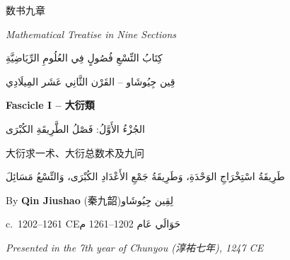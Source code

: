 \documentclass[11pt,a4paper]{article}
\newcommand{\ar}[1]{\arabicfont\beginR #1\endR}
\newcommand{\zhtext}[1]{{\chinese #1}}
\begin{document}
\begin{titlepage}
\begin{center}
\vspace*{1.5cm}

{\fontsize{28}{34}\selectfont\chineselg
\textcolor{titlecolor}{数书九章}}

\vspace{0.5cm}

{\fontsize{16}{20}\selectfont
\textcolor{sectioncolor}{\textit{Mathematical Treatise in Nine Sections}}}

\vspace{0.5cm}

{\large\ar{كِتَابُ التِّسْعِ فُصُولٍ فِي العُلُومِ الرِّيَاضِيَّةِ}}

\vspace{0.3cm}

{\footnotesize\ar{قِين جِيُوشَاو -- القَرْن الثَّانِي عَشَر المِيلَادِي}}

\vspace{1.2cm}

{\Large\bfseries Fascicle I -- \zhtext{大衍類}}

\vspace{0.3cm}

{\large\ar{الجُزْءُ الأَوَّلُ: فَصْلُ الطَّرِيقَةِ الكُبْرَى}}

\vspace{0.5cm}

{\normalsize\zhtext{大衍求一术、大衍总数术及九问}}

\vspace{0.3cm}

{\footnotesize\ar{طَرِيقَةُ اسْتِخْرَاجِ الوَحْدَةِ، وَطَرِيقَةُ جَمْعِ الأَعْدَادِ الكُبْرَى، وَالتِّسْعُ مَسَائِلَ}}

\vspace{1.5cm}

{\large By \textbf{Qin Jiushao} (\zhtext{秦九韶})\quad\ar{لِقِين جِيُوشَاو}}

\vspace{0.3cm}

{\normalsize c.~1202--1261 CE\quad\ar{حَوَالَي عَام 1202--1261 م}}

\vspace{0.3cm}

{\small\textit{Presented in the 7th year of Chunyou (\zhtext{淳祐七年}), 1247 CE}}


\end{center}
\end{titlepage}
\end{document}
